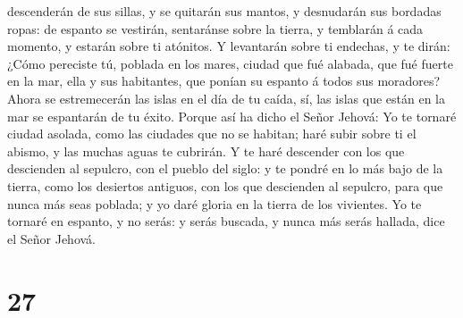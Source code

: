 descenderán de sus sillas, y se quitarán sus mantos, y desnudarán sus
bordadas ropas: de espanto se vestirán, sentaránse sobre la tierra, y
temblarán á cada momento, y estarán sobre ti atónitos.  Y
levantarán sobre ti endechas, y te dirán: ¿Cómo pereciste tú, poblada en
los mares, ciudad que fué alabada, que fué fuerte en la mar, ella y sus
habitantes, que ponían su espanto á todos sus moradores? 
Ahora se estremecerán las islas en el día de tu caída, sí, las islas que
están en la mar se espantarán de tu éxito.  Porque así ha
dicho el Señor Jehová: Yo te tornaré ciudad asolada, como las ciudades
que no se habitan; haré subir sobre ti el abismo, y las muchas aguas te
cubrirán.  Y te haré descender con los que descienden al
sepulcro, con el pueblo del siglo: y te pondré en lo más bajo de la
tierra, como los desiertos antiguos, con los que descienden al sepulcro,
para que nunca más seas poblada; y yo daré gloria en la tierra de los
vivientes.  Yo te tornaré en espanto, y no serás: y serás
buscada, y nunca más serás hallada, dice el Señor Jehová.

\hypertarget{section-26}{%
\section{27}\label{section-26}}

